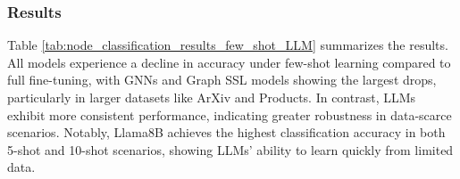 \subsubsection{Results}


Table \ref{tab:node_classification_results_few_shot_LLM} summarizes the results. All models experience a decline in accuracy under few-shot learning compared to full fine-tuning, with GNNs and Graph SSL models showing the largest drops, particularly in larger datasets like ArXiv and Products. In contrast, LLMs exhibit more consistent performance, indicating greater robustness in data-scarce scenarios. Notably, Llama8B achieves the highest classification accuracy in both 5-shot and 10-shot scenarios, showing LLMs’ ability to learn quickly from limited data.


